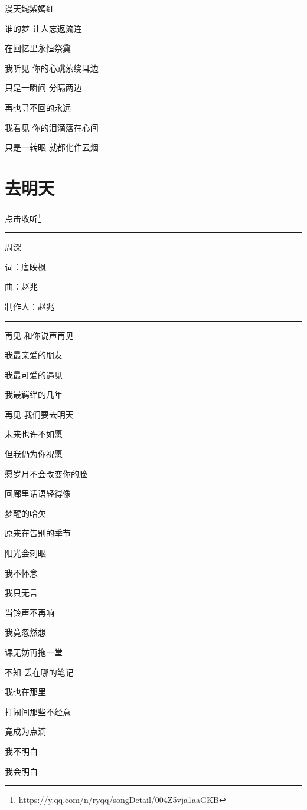 \documentclass[]{ctexbook}
\renewcommand{\href}[2]{#2\footnote{\url{#1}}}
\begin{document}
漫天姹紫嫣红

谁的梦 让人忘返流连

在回忆里永恒祭奠

我听见 你的心跳萦绕耳边

只是一瞬间 分隔两边

再也寻不回的永远

我看见 你的泪滴落在心间

只是一转眼 就都化作云烟

\section*{去明天}\label{go-tomorrow}


\href{https://y.qq.com/n/ryqq/songDetail/004Z5vja1aaGKB}{点击收听}

\begin{center}\rule{0.5\linewidth}{0.5pt}\end{center}

周深

词：唐映枫

曲：赵兆

制作人：赵兆

\begin{center}\rule{0.5\linewidth}{0.5pt}\end{center}

再见 和你说声再见

我最亲爱的朋友

我最可爱的遇见

我最羁绊的几年

再见 我们要去明天

未来也许不如愿

但我仍为你祝愿

愿岁月不会改变你的脸

回廊里话语轻得像

梦醒的哈欠

原来在告别的季节

阳光会刺眼

我不怀念

我只无言

当铃声不再响

我竟忽然想

课无妨再拖一堂

不知 丢在哪的笔记

我也在那里

打闹间那些不经意

竟成为点滴

我不明白

我会明白
\end{document}
